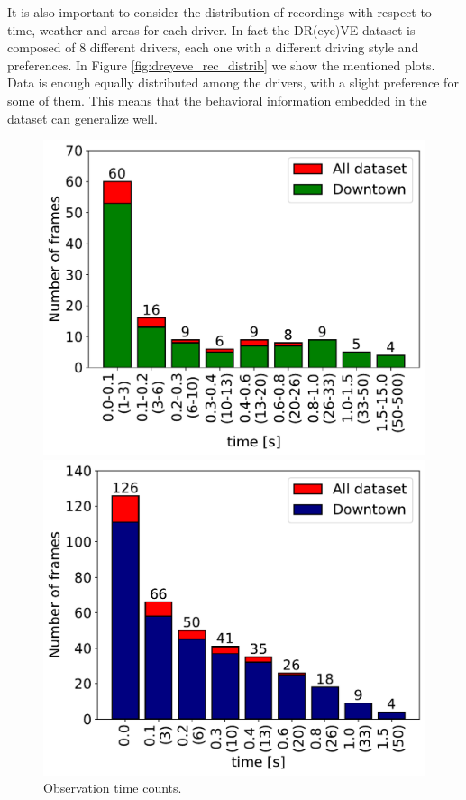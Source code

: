 It is also important to consider the distribution of recordings with respect to 
time, weather and areas for each driver. In fact the DR(eye)VE dataset is 
composed of 8 different drivers, each one with a different driving style and 
preferences. In Figure \ref{fig:dreyeve_rec_distrib} we 
show the mentioned plots. Data is enough equally distributed among the drivers, 
with a slight preference for some of them. This means that the behavioral 
information embedded in the dataset can generalize well.

\begin{figure}
    \centering
    \begin{minipage}{0.49\textwidth}
        \centering
        \includegraphics[width=\textwidth]{images/dreyeve/tracking_distrib.pdf}
        \caption[Observation time counts.]
        {Observation time counts.}
        \label{fig:tracking_distribution}
    \end{minipage}\hfill
    \begin{minipage}{0.49\textwidth}
        \centering
        \includegraphics[width=\textwidth]{images/dreyeve/tracking_distrib_cum.pdf}

\end{minipage}
\end{figure}
